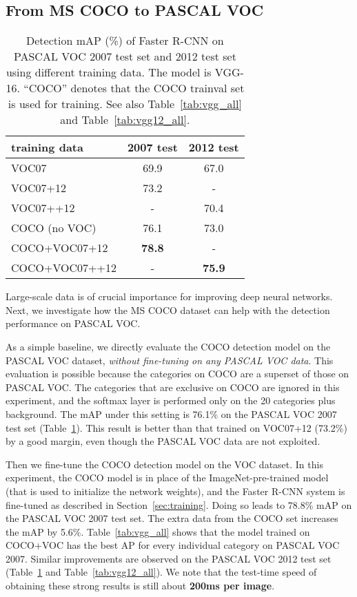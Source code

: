 \documentclass[10pt,journal,cspaper,compsoc]{IEEEtran}
\begin{document}
\subsection{From MS COCO to PASCAL VOC}

\setlength{\tabcolsep}{8pt}
\renewcommand{\arraystretch}{1.1}
\begin{table}[t]
\begin{center}
\caption{Detection mAP (\%) of Faster R-CNN on PASCAL VOC 2007 test set and 2012 test set using different training data. The model is VGG-16. ``COCO'' denotes that the COCO trainval set is used for training. See also Table~\ref{tab:vgg_all} and Table~\ref{tab:vgg12_all}.}
\vspace{-1em}
\small
\begin{tabular}{l|c|c}
  training data & 2007 test & 2012 test \\
  \hline\hline
  VOC07 & 69.9 & 67.0 \\
  VOC07+12 & 73.2 & - \\
  VOC07++12 & - & 70.4 \\
  \hline
  COCO (no VOC) & 76.1 & 73.0 \\
  COCO+VOC07+12 & \textbf{78.8} & - \\
  COCO+VOC07++12 & - & \textbf{75.9} \\
\end{tabular}
\label{tab:voc_coco}
\end{center}
\end{table}

Large-scale data is of crucial importance for improving deep neural networks. Next, we investigate how the MS COCO dataset can help with the detection performance on PASCAL VOC.

As a simple baseline, we directly evaluate the COCO detection model on the PASCAL VOC dataset, \emph{without fine-tuning on any PASCAL VOC data}. This evaluation is possible because the categories on COCO are a superset of those on PASCAL VOC. The categories that are exclusive on COCO are ignored in this experiment, and the softmax layer is performed only on the 20 categories plus background.
The mAP under this setting is 76.1\% on the PASCAL VOC 2007 test set (Table~\ref{tab:voc_coco}). This result is better than that trained on VOC07+12 (73.2\%) by a good margin, even though the PASCAL VOC data are not exploited.

Then we fine-tune the COCO detection model on the VOC dataset. In this experiment, the COCO model is in place of the ImageNet-pre-trained model (that is used to initialize the network weights), and the Faster R-CNN system is fine-tuned as described in Section~\ref{sec:training}. Doing so leads to 78.8\% mAP on the PASCAL VOC 2007 test set. The extra data from the COCO set increases the mAP by 5.6\%. Table~\ref{tab:vgg_all} shows that the model trained on COCO+VOC has the best AP for every individual category on PASCAL VOC 2007.
Similar improvements are observed on the PASCAL VOC 2012 test set (Table~\ref{tab:voc_coco} and Table~\ref{tab:vgg12_all}). We note that the test-time speed of obtaining these strong results is still about \textbf{200ms per image}.
\end{document}
